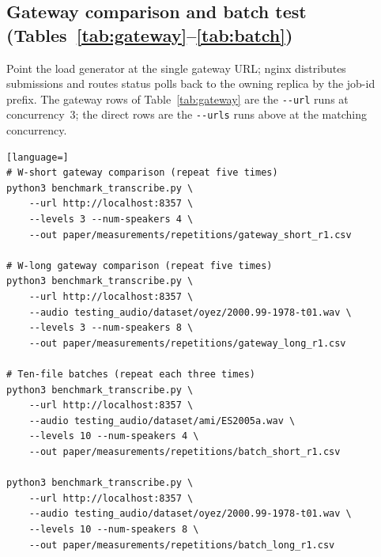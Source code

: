 \documentclass[10pt]{article}
\begin{document}
\subsection{Gateway comparison and batch test
(Tables~\ref{tab:gateway}--\ref{tab:batch})}
Point the load generator at the single gateway URL; nginx distributes submissions
and routes status polls back to the owning replica by the job-id prefix. The
gateway rows of Table~\ref{tab:gateway} are the \texttt{-{}-url} runs at
concurrency~3; the direct rows are the \texttt{-{}-urls} runs above at the
matching concurrency.
\begin{lstlisting}[language=]
# W-short gateway comparison (repeat five times)
python3 benchmark_transcribe.py \
    --url http://localhost:8357 \
    --levels 3 --num-speakers 4 \
    --out paper/measurements/repetitions/gateway_short_r1.csv

# W-long gateway comparison (repeat five times)
python3 benchmark_transcribe.py \
    --url http://localhost:8357 \
    --audio testing_audio/dataset/oyez/2000.99-1978-t01.wav \
    --levels 3 --num-speakers 8 \
    --out paper/measurements/repetitions/gateway_long_r1.csv

# Ten-file batches (repeat each three times)
python3 benchmark_transcribe.py \
    --url http://localhost:8357 \
    --audio testing_audio/dataset/ami/ES2005a.wav \
    --levels 10 --num-speakers 4 \
    --out paper/measurements/repetitions/batch_short_r1.csv

python3 benchmark_transcribe.py \
    --url http://localhost:8357 \
    --audio testing_audio/dataset/oyez/2000.99-1978-t01.wav \
    --levels 10 --num-speakers 8 \
    --out paper/measurements/repetitions/batch_long_r1.csv
\end{lstlisting}
\end{document}
